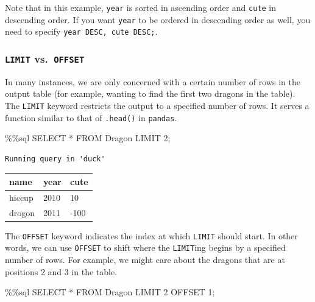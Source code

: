 \documentclass[
  letterpaper,
  DIV=11,
  numbers=noendperiod]{scrreprt}
\newenvironment{Shaded}{\begin{snugshade}}{\end{snugshade}}
\newcommand{\DecValTok}[1]{\textcolor[rgb]{0.68,0.00,0.00}{#1}}
\newcommand{\NormalTok}[1]{\textcolor[rgb]{0.00,0.23,0.31}{#1}}
\newcommand{\OperatorTok}[1]{\textcolor[rgb]{0.37,0.37,0.37}{#1}}
\begin{document}
Note that in this example, \texttt{year} is sorted in ascending order
and \texttt{cute} in descending order. If you want \texttt{year} to be
ordered in descending order as well, you need to specify
\texttt{year\ DESC,\ cute\ DESC;}.

\subsubsection{\texorpdfstring{\texttt{LIMIT}
vs.~\texttt{OFFSET}}{LIMIT vs.~OFFSET}}\label{limit-vs.-offset}

In many instances, we are only concerned with a certain number of rows
in the output table (for example, wanting to find the first two dragons
in the table). The \texttt{LIMIT} keyword restricts the output to a
specified number of rows. It serves a function similar to that of
\texttt{.head()} in \texttt{pandas}.

\begin{Shaded}
\begin{Highlighting}[]
\OperatorTok{\%\%}\NormalTok{sql}
\NormalTok{SELECT }\OperatorTok{*}
\NormalTok{FROM Dragon}
\NormalTok{LIMIT }\DecValTok{2}\OperatorTok{;}
\end{Highlighting}
\end{Shaded}

\begin{verbatim}
Running query in 'duck'
\end{verbatim}

\begin{longtable}[]{@{}lll@{}}
\toprule\noalign{}
name & year & cute \\
\midrule\noalign{}
\endhead
\bottomrule\noalign{}
\endlastfoot
hiccup & 2010 & 10 \\
drogon & 2011 & -100 \\
\end{longtable}

The \texttt{OFFSET} keyword indicates the index at which \texttt{LIMIT}
should start. In other words, we can use \texttt{OFFSET} to shift where
the \texttt{LIMIT}ing begins by a specified number of rows. For example,
we might care about the dragons that are at positions 2 and 3 in the
table.

\begin{Shaded}
\begin{Highlighting}[]
\OperatorTok{\%\%}\NormalTok{sql}
\NormalTok{SELECT }\OperatorTok{*}
\NormalTok{FROM Dragon}
\NormalTok{LIMIT }\DecValTok{2}
\NormalTok{OFFSET }\DecValTok{1}\OperatorTok{;}
\end{Highlighting}
\end{Shaded}
\end{document}

